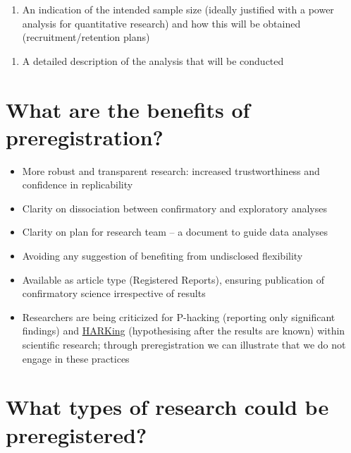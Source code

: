 \documentclass[
  letterpaper,
  DIV=11,
  numbers=noendperiod]{scrreprt}
\providecommand{\tightlist}{%
  \setlength{\itemsep}{0pt}\setlength{\parskip}{0pt}}\usepackage{longtable,booktabs,array}
\begin{document}
\begin{enumerate}
\def\labelenumi{\arabic{enumi}.}
\setcounter{enumi}{3}
\tightlist
\item
  An indication of the intended sample size (ideally justified with a
  power analysis for quantitative research) and how this will be
  obtained (recruitment/retention plans)~
\end{enumerate}

\begin{enumerate}
\def\labelenumi{\arabic{enumi}.}
\setcounter{enumi}{4}
\tightlist
\item
  A detailed description of the analysis that will be conducted~
\end{enumerate}

\hypertarget{what-are-the-benefits-of-preregistration}{%
\section{What are the benefits of
preregistration?~}\label{what-are-the-benefits-of-preregistration}}

\begin{itemize}
\item
  More robust and transparent research: increased trustworthiness and
  confidence in replicability~~
\item
  Clarity on dissociation between confirmatory and exploratory
  analyses~~~
\item
  Clarity on plan for research team -- a document to guide data
  analyses~~
\end{itemize}

\begin{itemize}
\item
  Avoiding any suggestion of benefiting from undisclosed flexibility~~
\item
  Available as article type (Registered Reports), ensuring publication
  of confirmatory science irrespective of results~~
\item
  Researchers are being criticized for P-hacking (reporting only
  significant findings) and
  \href{https://journals.sagepub.com/doi/10.1207/s15327957pspr0203_4}{HARKing}
  (hypothesising after the results are known) within scientific
  research; through preregistration we can illustrate that we do not
  engage in these practices~
\end{itemize}

\hypertarget{what-types-of-research-could-be-preregistered}{%
\section{What types of research could be
preregistered?~}\label{what-types-of-research-could-be-preregistered}}
\end{document}
